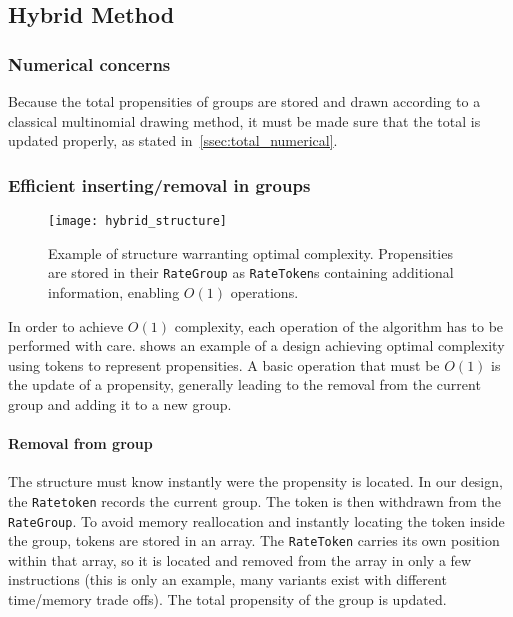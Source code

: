 \subsection{Hybrid Method}

\subsubsection{Numerical concerns}

Because the total propensities of groups are stored and drawn according to a classical multinomial drawing method, it must be made sure that the total is updated properly, as stated in~\ref{ssec:total_numerical}.

\subsubsection{Efficient inserting/removal in groups}

\begin{figure}[!h]
  \centering
  \texttt{[image: hybrid\_structure]}
  \caption{Example of structure warranting optimal complexity. Propensities are stored in their \texttt{RateGroup} as \texttt{RateToken}s containing additional information, enabling $O(1)$ operations.}
  \label{fig:hybrid_structure}
\end {figure}

In order to achieve $O(1)$ complexity, each operation of the algorithm has to be performed with care.  shows an example of a design achieving optimal complexity using tokens to represent propensities. A basic operation that must be $O(1)$ is the update of a propensity, generally leading to the removal from the current group and adding it to a new group.

\paragraph{Removal from group} The structure must know instantly were the propensity is located. In our design, the \texttt{Ratetoken} records the current group. The token is then withdrawn from the \texttt{RateGroup}. To avoid memory reallocation and instantly locating the token inside the group, tokens are stored in an array. The \texttt{RateToken} carries its own position within that array, so it is located and removed from the array in only a few instructions (this is only an example, many variants exist with different time/memory trade offs). The total propensity of the group is updated.

